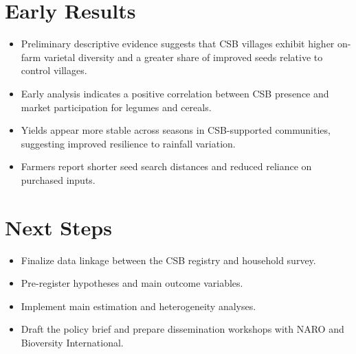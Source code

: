 \documentclass{article}
\begin{document}
\section{Early Results}

\begin{itemize}
    \item Preliminary descriptive evidence suggests that CSB villages exhibit higher on-farm varietal diversity and a greater share of improved seeds relative to control villages.
    \item Early analysis indicates a positive correlation between CSB presence and market participation for legumes and cereals.
    \item Yields appear more stable across seasons in CSB-supported communities, suggesting improved resilience to rainfall variation.
    \item Farmers report shorter seed search distances and reduced reliance on purchased inputs.
\end{itemize}

\section{Next Steps}

\begin{itemize}
    \item Finalize data linkage between the CSB registry and household survey.
    \item Pre-register hypotheses and main outcome variables.
    \item Implement main estimation and heterogeneity analyses.
    \item Draft the policy brief and prepare dissemination workshops with NARO and Bioversity International.
\end{itemize}

\nocite{*}

\end{document}
